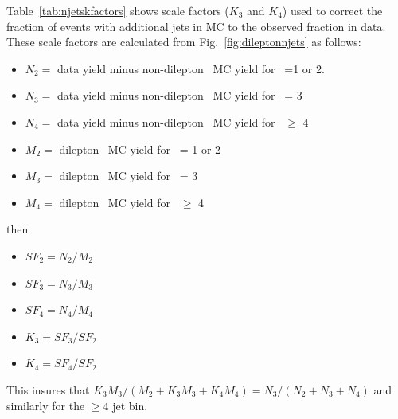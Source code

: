 

Table~\ref{tab:njetskfactors}  shows scale factors ($K_3$ and $K_4$)
used to correct the
fraction of events with additional jets in MC to the observed fraction
in data.   These scale factors are calculated from Fig.~\ref{fig:dileptonnjets} 
as follows:
\begin{itemize}
\item $N_{2}=$ data yield minus non-dilepton \ttbar\ MC yield for
  \njets\ =1 or 2.
\item $N_{3}=$ data yield minus non-dilepton \ttbar\ MC yield for \njets\ = 3
\item $N_{4}=$ data yield minus non-dilepton \ttbar\ MC yield for \njets\ $\geq$ 4
\item $M_{2}=$ dilepton \ttbar\ MC yield for \njets\ = 1 or 2
\item $M_{3}=$ dilepton \ttbar\ MC yield for \njets\ = 3
\item $M_{4}=$ dilepton \ttbar\ MC yield for \njets\ $\geq$ 4
\end{itemize}
\noindent then
\begin{itemize}
\item $SF_2 = N_2 / M_2$
\item $SF_3 = N_3 / M_3$
\item $SF_4 = N_4 / M_4$
\item $K_3 = SF_3 / SF_2$
\item $K_4 = SF_4 / SF_2$
\end{itemize}
\noindent This insures that $K_3 M_3/(M_2 + K_3 M_3 + K_4 M_4) = N_3 /
(N_2+N_3+N_4)$ and similarly for the $\geq 4$ jet bin.

